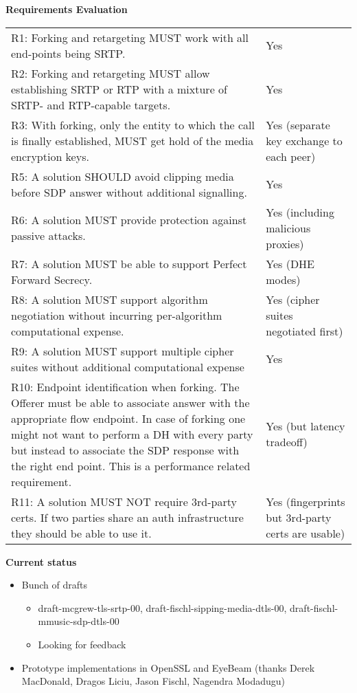\documentclass[helvetica,fancybox,landscape]{seminar}
\newcommand{\heading}[1]{%
  \begin{center} 
    \large\bf 
    #1 
  \end{center} 
  \vspace{.4 in}}
\begin{document}
\begin{slide}
\heading{Requirements Evaluation}

{\tiny
\begin{tabular}{p{3 in} p{1 in}}
R1: Forking and retargeting MUST work with all end-points being SRTP. & Yes \\
R2: Forking and retargeting MUST allow establishing SRTP or RTP with a mixture of SRTP- and RTP-capable targets. & Yes \\
R3: With forking, only the entity to which the call is finally established, MUST get hold of the media encryption keys. & Yes (separate key exchange to each peer)\\
R5: A solution SHOULD avoid clipping media before SDP answer without additional signalling. & Yes \\
R6: A solution MUST provide protection against passive attacks. & Yes (including malicious proxies)\\ 
R7: A solution MUST be able to support Perfect Forward Secrecy. & Yes (DHE modes) \\
R8: A solution MUST support algorithm negotiation without incurring per-algorithm computational expense. & Yes (cipher suites negotiated first) \\
R9: A solution MUST support multiple cipher suites without additional computational expense & Yes \\
R10:  Endpoint identification when forking.  The Offerer must be able to associate answer with the appropriate flow endpoint.  In case of forking one might not want to perform a DH with every party but instead to associate the SDP response with the right end point. This is a performance related requirement. & Yes (but latency tradeoff) \\
R11: A solution MUST NOT require 3rd-party certs.  If two parties share an auth infrastructure they should be able to use it. & Yes (fingerprints but 3rd-party certs are usable)
\end{tabular}
}
\end{slide}

\begin{slide}
\heading{Current status}

\begin{itemize}
\item Bunch of drafts
\begin{itemize}
\item draft-mcgrew-tls-srtp-00, draft-fischl-sipping-media-dtls-00, draft-fischl-mmusic-sdp-dtls-00
\item Looking for feedback
\end{itemize}
\item Prototype implementations in OpenSSL and EyeBeam (thanks Derek MacDonald, Dragos Liciu, Jason Fischl, Nagendra Modadugu)
\end{itemize}

\end{slide}
\end{document}
